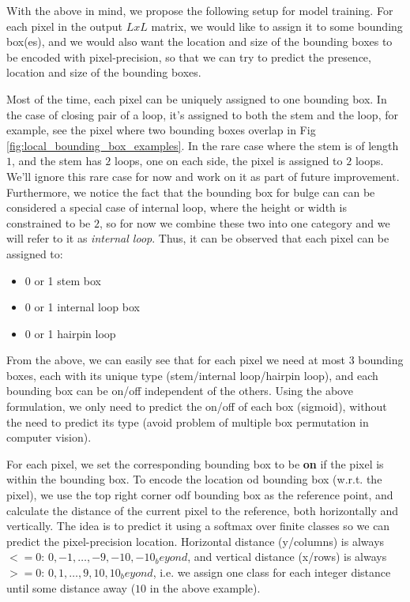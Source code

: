 \documentclass[12pt]{article}
\begin{document}
With the above in mind, we propose the following setup for model training.
For each pixel in the output $L x L$ matrix, we would like to assign it to some bounding box(es),
and we would also want the location and size of the bounding boxes to be encoded with pixel-precision,
so that we can try to predict the presence, location and size of the bounding boxes.



Most of the time, each pixel can be uniquely assigned to one bounding box.
In the case of closing pair of a loop, it's assigned to both the stem and the loop,
for example, see the pixel where two bounding boxes overlap in Fig \ref{fig:local_bounding_box_examples}.
In the rare case where the stem is of length $1$, and the stem has $2$ loops, one on each side,
the pixel is assigned to $2$ loops. We'll ignore this rare case for now and work on it as part of future improvement.
Furthermore, we notice the fact that the bounding box for bulge can can be considered a special case of internal loop,
where the height or width is constrained to be $2$, so for now we combine these two into one category and we will refer to
it as \textit{internal loop}.
Thus, it can be observed that each pixel can be assigned to:

\begin{itemize}
    \item 0 or 1 stem box
    \item 0 or 1 internal loop box
    \item 0 or 1 hairpin loop
\end{itemize}

From the above, we can easily see that for each pixel we need at most 3 bounding boxes,
each with its unique type (stem/internal loop/hairpin loop),
and each bounding box can be on/off independent of the others.
Using the above formulation, we only need to predict the on/off of each box (sigmoid),
without the need to predict its type (avoid problem of multiple box permutation in computer vision).

For each pixel, we set the corresponding bounding box to be \textbf{on} if the pixel is within the bounding box.
To encode the location od bounding box (w.r.t. the pixel),
we use the top right corner odf bounding box as the reference point,
and calculate the distance of the current pixel to the reference,
both horizontally and vertically.
The idea is to predict it using a softmax over finite classes so we can predict the pixel-precision location.
Horizontal distance (y/columns) is always $<= 0$: $ 0, -1, \dots, -9, -10, -10_beyond$,
and vertical distance (x/rows) is always $>= 0$: $0, 1, \dots, 9, 10, 10_beyond$,
i.e. we assign one class for each integer distance until some distance away ($10$ in the above example).
\end{document}
